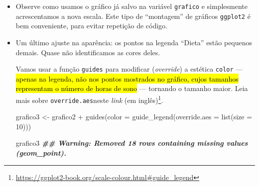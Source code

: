 \documentclass[
  11pt]{report}
\newenvironment{Shaded}{\begin{snugshade}}{\end{snugshade}}
\newcommand{\AttributeTok}[1]{\textcolor[rgb]{0.77,0.63,0.00}{#1}}
\newcommand{\DecValTok}[1]{\textcolor[rgb]{0.00,0.00,0.81}{#1}}
\newcommand{\DocumentationTok}[1]{\textcolor[rgb]{0.56,0.35,0.01}{\textbf{\textit{#1}}}}
\newcommand{\FunctionTok}[1]{\textcolor[rgb]{0.00,0.00,0.00}{#1}}
\newcommand{\NormalTok}[1]{#1}
\newcommand{\OtherTok}[1]{\textcolor[rgb]{0.56,0.35,0.01}{#1}}
\newcommand{\SpecialCharTok}[1]{\textcolor[rgb]{0.00,0.00,0.00}{#1}}
\newcommand{\StringTok}[1]{\textcolor[rgb]{0.31,0.60,0.02}{#1}}
\DeclareRobustCommand{\href}[2]{#2\footnote{\url{#1}}}
\renewenvironment{Shaded}{
    \begin{mdframed}[%
      roundcorner=2pt,%
      innerleftmargin=5pt,%
      innerrightmargin=5pt,%
      topline=true,%
      leftline=true,%
      rightline=true,%
      bottomline=true,%
      linewidth=0.5pt,%
      linecolor=black!20,%
      backgroundcolor=black!2,%
      skipabove=2ex,%
      skipbelow=2.5ex%
    ]%
  }
  {
    \end{mdframed}
  }
\begin{document}
\begin{itemize}
\begin{Shaded}
\begin{Highlighting}[]
\NormalTok{grafico2 }\OtherTok{\textless{}{-}}\NormalTok{ grafico }\SpecialCharTok{+}
  \FunctionTok{scale\_color\_discrete}\NormalTok{(}
    \AttributeTok{palette =} \StringTok{\textquotesingle{}RdBu\textquotesingle{}}\NormalTok{,}
    \AttributeTok{na.value =} \StringTok{\textquotesingle{}black\textquotesingle{}}\NormalTok{,}
    \AttributeTok{type =}\NormalTok{ scale\_color\_brewer}
\NormalTok{  )}

\NormalTok{grafico2}
\DocumentationTok{\#\# Warning: Removed 18 rows containing missing values (geom\_point).}
\end{Highlighting}
\end{Shaded}

  \begin{center}\texttt{[image: \_main\_files/figure-latex/unnamed-chunk-69-1]} \end{center}
\item
  Observe como usamos o gráfico já salvo na variável \texttt{grafico} e simplesmente acrescentamos a nova escala. Este tipo de ``montagem'' de gráficos \texttt{ggplot2} é bem conveniente, para evitar repetição de código.
\item
  Um último ajuste na aparência: os pontos na legenda ``Dieta'' estão pequenos demais. Quase não identificamos as cores deles.

  Vamos usar a função \texttt{guides} para modificar (\emph{override}) a estética \texttt{color} --- {\hl{apenas na legenda, não nos pontos mostrados no gráfico, cujos tamanhos representam o número de horas de sono}} --- tornando o tamanho maior. \href{https://ggplot2-book.org/scale-colour.html\#guide_legend}{Leia mais sobre \texttt{override.aes}neste \emph{link} (em inglês)}.

\begin{Shaded}
\begin{Highlighting}[]
\NormalTok{grafico3 }\OtherTok{\textless{}{-}}\NormalTok{ grafico2 }\SpecialCharTok{+}
  \FunctionTok{guides}\NormalTok{(}\AttributeTok{color =} \FunctionTok{guide\_legend}\NormalTok{(}\AttributeTok{override.aes =} \FunctionTok{list}\NormalTok{(}\AttributeTok{size =} \DecValTok{10}\NormalTok{)))}

\NormalTok{grafico3}
\DocumentationTok{\#\# Warning: Removed 18 rows containing missing values (geom\_point).}
\end{Highlighting}
\end{Shaded}


\end{itemize}
\end{document}

